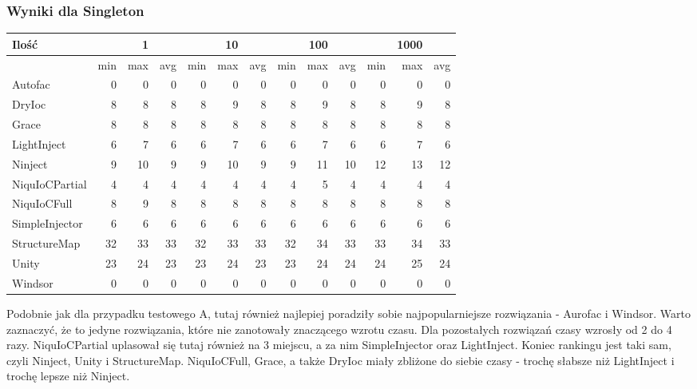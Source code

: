 \documentclass[12pt]{article}
\begin{document}
\subsubsection{Wyniki dla Singleton}
\begin{center}
\begin{small}
	\begin{tabular}{ | l | r r r | r r r | r r r | r r r | }
    		\hline
Ilość & & 1 & & & 10 & & & 100 & & & 1000 & \\ \hline
 & min & max & avg & min & max & avg & min & max & avg & min & max & avg \\ \hline
Autofac & 0 & 0 & 0 & 0 & 0 & 0 & 0 & 0 & 0 & 0 & 0 & 0 \\ \hline
DryIoc & 8 & 8 & 8 & 8 & 9 & 8 & 8 & 9 & 8 & 8 & 9 & 8 \\ \hline
Grace & 8 & 8 & 8 & 8 & 8 & 8 & 8 & 8 & 8 & 8 & 8 & 8 \\ \hline
LightInject & 6 & 7 & 6 & 6 & 7 & 6 & 6 & 7 & 6 & 6 & 7 & 6 \\ \hline
Ninject & 9 & 10 & 9 & 9 & 10 & 9 & 9 & 11 & 10 & 12 & 13 & 12 \\ \hline
NiquIoCPartial & 4 & 4 & 4 & 4 & 4 & 4 & 4 & 5 & 4 & 4 & 4 & 4 \\ \hline
NiquIoCFull & 8 & 9 & 8 & 8 & 8 & 8 & 8 & 8 & 8 & 8 & 8 & 8 \\ \hline
SimpleInjector & 6 & 6 & 6 & 6 & 6 & 6 & 6 & 6 & 6 & 6 & 6 & 6 \\ \hline
StructureMap & 32 & 33 & 33 & 32 & 33 & 33 & 32 & 34 & 33 & 33 & 34 & 33 \\ \hline
Unity & 23 & 24 & 23 & 23 & 24 & 23 & 23 & 24 & 24 & 24 & 25 & 24 \\ \hline
Windsor & 0 & 0 & 0 & 0 & 0 & 0 & 0 & 0 & 0 & 0 & 0 & 0 \\ \hline
  	\end{tabular}
\end{small}
\end{center}
Podobnie jak dla przypadku testowego A, tutaj również najlepiej poradziły sobie najpopularniejsze rozwiązania - Aurofac i Windsor. Warto zaznaczyć, że to jedyne rozwiązania, które nie zanotowały znaczącego wzrotu czasu. Dla pozostałych rozwiązań czasy wzrosły od 2 do 4 razy. NiquIoCPartial uplasował się tutaj również na 3 miejscu, a za nim SimpleInjector oraz LightInject. Koniec rankingu jest taki sam, czyli Ninject, Unity i StructureMap. NiquIoCFull, Grace, a także DryIoc miały zbliżone do siebie czasy - trochę słabsze niż LightInject i trochę lepsze niż Ninject.
\end{document}
